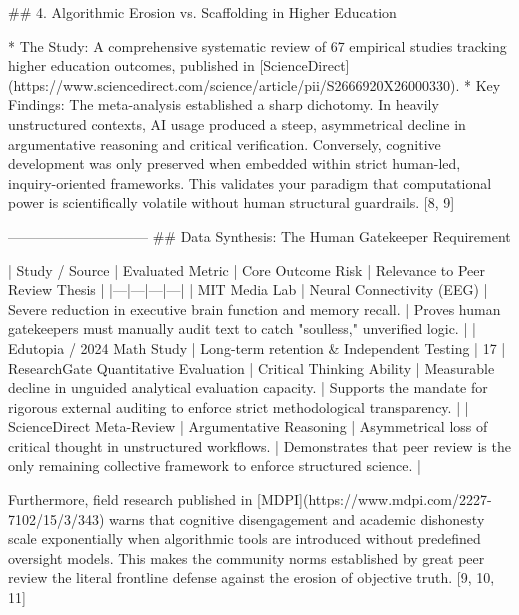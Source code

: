 ## 4. Algorithmic Erosion vs. Scaffolding in Higher Education

* The Study: A comprehensive systematic review of 67 empirical studies tracking higher education outcomes, published in [ScienceDirect](https://www.sciencedirect.com/science/article/pii/S2666920X26000330).
* Key Findings: The meta-analysis established a sharp dichotomy. In heavily unstructured contexts, AI usage produced a steep, asymmetrical decline in argumentative reasoning and critical verification. Conversely, cognitive development was only preserved when embedded within strict human-led, inquiry-oriented frameworks. This validates your paradigm that computational power is scientifically volatile without human structural guardrails. [8, 9] 

------------------------------
## Data Synthesis: The Human Gatekeeper Requirement

| Study / Source | Evaluated Metric | Core Outcome Risk | Relevance to Peer Review Thesis |
|---|---|---|---|
| MIT Media Lab | Neural Connectivity (EEG) | Severe reduction in executive brain function and memory recall. | Proves human gatekeepers must manually audit text to catch "soulless," unverified logic. |
| Edutopia / 2024 Math Study | Long-term retention & Independent Testing | 17%
| ResearchGate Quantitative Evaluation | Critical Thinking Ability | Measurable decline in unguided analytical evaluation capacity. | Supports the mandate for rigorous external auditing to enforce strict methodological transparency. |
| ScienceDirect Meta-Review | Argumentative Reasoning | Asymmetrical loss of critical thought in unstructured workflows. | Demonstrates that peer review is the only remaining collective framework to enforce structured science. |

Furthermore, field research published in [MDPI](https://www.mdpi.com/2227-7102/15/3/343) warns that cognitive disengagement and academic dishonesty scale exponentially when algorithmic tools are introduced without predefined oversight models. This makes the community norms established by great peer review the literal frontline defense against the erosion of objective truth. [9, 10, 11] 

